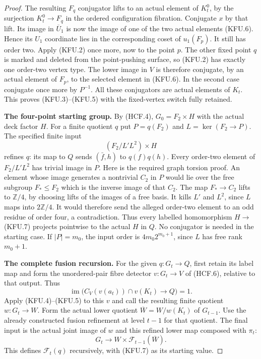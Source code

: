 \begin{proof}
The resulting $F_q$ conjugator lifts to an actual element
of $K_t^0$, by the surjection $K_t^0\to F_q$ in the
ordered configuration fibration.  Conjugate $x$ by that
lift.  Its image in $\overline U_1$ is now the image of
one of the two actual elements (KFU.6).  Hence its
$U_1$ coordinate lies in the corresponding coset of
$u_1(F_p)$.  It still has order two.
Apply (KFU.2) once more, now to the point $p$.
The other fixed point $q$ is marked and deleted from
the point-pushing surface, so (KFU.2) has exactly one
order-two vertex type.  The lower image in $V$ is
therefore conjugate, by an actual element of $F_p$,
to the selected element in (KFU.6).
In the second case conjugate once more by $P^{-1}$.
All these conjugators are actual elements of $K_t$.
This proves (KFU.3)--(KFU.5) with the fixed-vertex switch
fully retained.

\par\medskip\noindent\textbf{The four-point starting group.}\quad
By (HCF.4), $G_0=F_2\times H$ with the actual deck
factor $H$.  For a finite quotient $q$ put $P=q(F_2)$
and $L=\ker(F_2\to P)$.  The specified finite input
\[
                    (F_2/L'L^2)\times H               \tag{KFU.7}
\]
refines $q$: its map to $Q$ sends $(\bar f,h)$ to
$q(f)q(h)$.  Every order-two element of $F_2/L'L^2$
has trivial image in $P$.  Here is the required graph
torsion proof.  An element whose image generates a
nontrivial $C_2$ in $P$ would lie over the free subgroup
$F_*\leq F_2$ which is the inverse image of that $C_2$.
The map $F_*\to C_2$ lifts to $\mathbb Z/4$, by
choosing lifts of the images of a free basis.  It kills
$L'$ and $L^2$, since $L$ maps into $2\mathbb Z/4$.
It would therefore send the alleged order-two element
to an odd residue of order four, a contradiction.
Thus every labelled homomorphism $H\to$(KFU.7) projects
pointwise to the actual $H$ in $Q$.  No conjugator is
needed in the starting case.  If $|P|=m_0$, the input
order is $4m_0 2^{m_0+1}$, since $L$ has free rank
$m_0+1$.

\par\medskip\noindent\textbf{The complete fusion recursion.}\quad
For the given $q:G_t\to Q$, first retain its label map
and form the unordered-pair fibre detector
$v:G_t\to V$ of (HCF.6), relative to that output.
Thus
\[
 \operatorname{im}\bigl(C_V(v(a_t))\cap v(K_t)
                                      \longrightarrow Q\bigr)=1.
                                                               \tag{KFU.8}
\]
Apply (KFU.4)--(KFU.5) to this $v$ and call the resulting
finite quotient $w:G_t\to W$.  Form the actual lower
quotient $\overline W=W/w(K_t)$ of $G_{t-1}$.
Use the already constructed fusion refinement at level
$t-1$ for that quotient.  The final input is the actual
joint image of $w$ and this refined lower map composed
with $\pi_t$:
\[
 G_t\longrightarrow
 W\times\mathcal F_{t-1}(\overline W).
                                                               \tag{KFU.9}
\]
This defines $\mathcal F_t(q)$ recursively, with (KFU.7)
as its starting value.


\end{proof}
